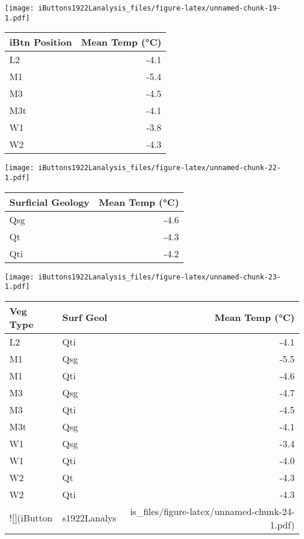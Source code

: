 \documentclass[
]{article}
\begin{document}
\texttt{[image: iButtons1922Lanalysis\_files/figure-latex/unnamed-chunk-19-1.pdf]}

\begin{longtable}[]{@{}lr@{}}
\toprule\noalign{}
iBtn Position & Mean Temp (°C) \\
\midrule\noalign{}
\endhead
\bottomrule\noalign{}
\endlastfoot
L2 & -4.1 \\
M1 & -5.4 \\
M3 & -4.5 \\
M3t & -4.1 \\
W1 & -3.8 \\
W2 & -4.3 \\
\end{longtable}

\texttt{[image: iButtons1922Lanalysis\_files/figure-latex/unnamed-chunk-22-1.pdf]}

\begin{longtable}[]{@{}lr@{}}
\toprule\noalign{}
Surficial Geology & Mean Temp (°C) \\
\midrule\noalign{}
\endhead
\bottomrule\noalign{}
\endlastfoot
Qsg & -4.6 \\
Qt & -4.3 \\
Qti & -4.2 \\
\end{longtable}

\texttt{[image: iButtons1922Lanalysis\_files/figure-latex/unnamed-chunk-23-1.pdf]}

\begin{longtable}[]{@{}llr@{}}
\toprule\noalign{}
Veg Type & Surf Geol & Mean Temp (°C) \\
\midrule\noalign{}
\endhead
\bottomrule\noalign{}
\endlastfoot
L2 & Qti & -4.1 \\
M1 & Qsg & -5.5 \\
M1 & Qti & -4.6 \\
M3 & Qsg & -4.7 \\
M3 & Qti & -4.5 \\
M3t & Qsg & -4.1 \\
W1 & Qsg & -3.4 \\
W1 & Qti & -4.0 \\
W2 & Qt & -4.3 \\
W2 & Qti & -4.3 \\
!{[}{]}(iButton & s1922Lanalys &
is\_files/figure-latex/unnamed-chunk-24-1.pdf) \\
\end{longtable}
\end{document}
